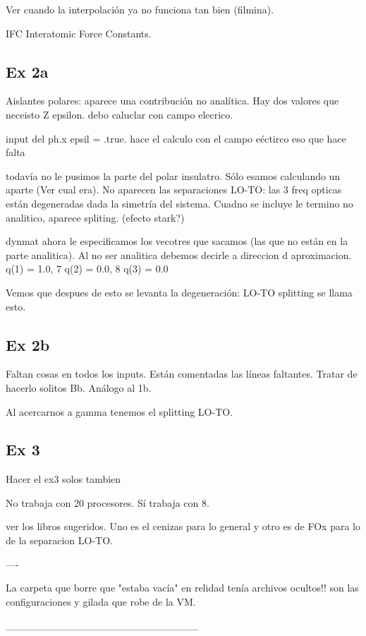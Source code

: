   Ver cuando la interpolación ya no funciona tan bien (filmina).

  IFC Interatomic Force Constants.

\subsection{Ex 2a}

  Aislantes polares: aparece una contribución no analítica. Hay dos valores que neceisto Z epsilon. debo caluclar con campo elecrico.

  input del ph.x
  epsil = .true.
 hace el calculo con el campo eéctirco eso que hace falta

  todavía no le pusimos la parte del polar insulatro. Sólo esamos calculando un aparte (Ver cual era). No aparecen las separaciones LO-TO: las 3 freq opticas están degeneradas dada la simetría del sistema. Cuadno se incluye le termino no analitico, aparece spliting. (efecto stark?)

  dynmat ahora le especificamos los vecotres que sacamos (las que no están en la parte analitica). Al no ser analitica debemos decirle a direccion d aproximacion.
  q(1) = 1.0,
  7     q(2) = 0.0,
  8     q(3) = 0.0

  Vemos que despues de esto se levanta la degeneración: LO-TO splitting se llama esto.

\subsection{Ex 2b}

  Faltan cosas en todos los inputs. Están comentadas las líneas faltantes. Tratar de hacerlo solitos Bb. Análogo al 1b.

  Al acercarnos a gamma tenemos el splitting LO-TO.

\subsection{Ex 3}

  Hacer el ex3 solos tambien

  No trabaja con 20 procesores. Sí trabaja con 8.


  ver los libros sugeridos. Uno es el cenizas para lo general y otro es de FOx para lo de la separacion LO-TO.

----

La carpeta que borre que "estaba vacía" en relidad tenía archivos ocultos!! son las configuraciones y gilada que robe de la VM.




__________________________

